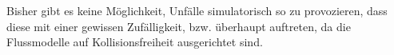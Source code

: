 Bisher gibt es keine Möglichkeit, Unfälle simulatorisch so zu provozieren, dass diese mit einer gewissen Zufälligkeit, bzw. überhaupt auftreten, da die Flussmodelle auf Kollisionsfreiheit ausgerichtet sind.




%
%
%
